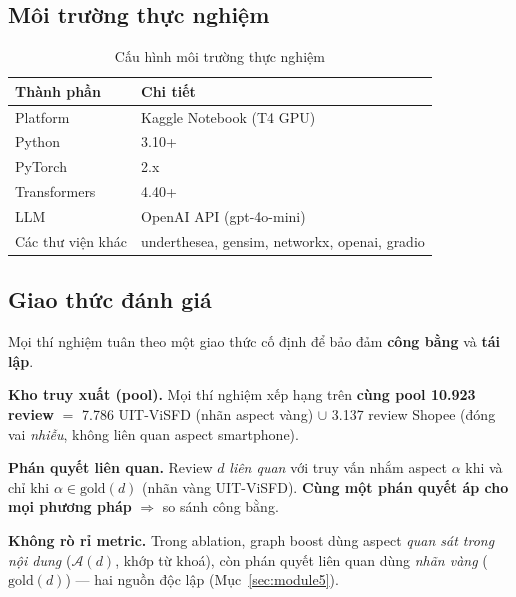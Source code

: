 \documentclass[12pt,a4paper]{article}
\begin{document}
\subsection{Môi trường thực nghiệm}

\begin{table}[H]
\centering
\caption{Cấu hình môi trường thực nghiệm}
\begin{tabular}{ll}
\toprule
\textbf{Thành phần} & \textbf{Chi tiết} \\
\midrule
Platform & Kaggle Notebook (T4 GPU) \\
Python & 3.10+ \\
PyTorch & 2.x \\
Transformers & 4.40+ \\
LLM & OpenAI API (gpt-4o-mini) \\
Các thư viện khác & underthesea, gensim, networkx, openai, gradio \\
\bottomrule
\end{tabular}
\end{table}

\subsection{Giao thức đánh giá}
\label{sec:protocol}

Mọi thí nghiệm tuân theo một giao thức cố định để bảo đảm \textbf{công bằng} và \textbf{tái lập}.

\noindent\textbf{Kho truy xuất (pool).} Mọi thí nghiệm xếp hạng trên \textbf{cùng pool 10.923 review} $=$ 7.786 UIT-ViSFD (nhãn aspect vàng) $\cup$ 3.137 review Shopee (đóng vai \textit{nhiễu}, không liên quan aspect smartphone).

\noindent\textbf{Phán quyết liên quan.} Review $d$ \textit{liên quan} với truy vấn nhắm aspect $\alpha$ khi và chỉ khi $\alpha\in\text{gold}(d)$ (nhãn vàng UIT-ViSFD). \textbf{Cùng một phán quyết áp cho mọi phương pháp} $\Rightarrow$ so sánh công bằng.

\noindent\textbf{Không rò rỉ metric.} Trong ablation, graph boost dùng aspect \textit{quan sát trong nội dung} ($\mathcal{A}(d)$, khớp từ khoá), còn phán quyết liên quan dùng \textit{nhãn vàng} ($\text{gold}(d)$) --- hai nguồn độc lập (Mục~\ref{sec:module5}).
\end{document}
